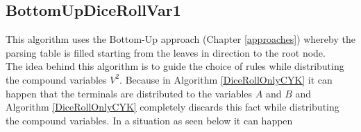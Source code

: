 \subsection{BottomUpDiceRollVar1}
This algorithm uses the Bottom-Up approach (Chapter \ref{approaches}) whereby the parsing table is filled starting from the leaves in direction to the root node.\\
The idea behind this algorithm is to guide the choice of rules while distributing the compound variables $V^2$. Because in Algorithm \ref{DiceRollOnlyCYK} it can happen that the terminals are distributed to the variables $A$ and $B$ and Algorithm \ref{DiceRollOnlyCYK} completely discards this fact while distributing the compound variables. In a situation as seen below it can happen \\
\noindent
\begin{figure}[h]
	\begin{minipage}{6in}
		\centering
		\hspace*{.2in}
\end{minipage}
\end{figure}
